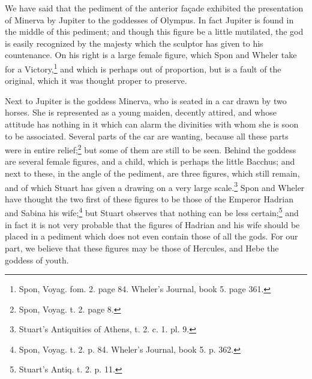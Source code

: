 \documentclass[a4paper, 11pt, oneside, polutonikogreek, english]{article}
\begin{document}
We have said that the pediment of the anterior façade exhibited the presentation of Minerva by Jupiter to the goddesses of Olympus. In fact Jupiter is found in the middle of this pediment; and though this figure be a little mutilated, the god is easily recognized by the majesty which the sculptor has given to his countenance. On his right is a large female figure, which Spon and Wheler take for a Victory,\footnote{Spon, Voyag. fom. 2. page 84. Wheler's Journal, book 5. page 361.} and which is perhaps out of proportion, but is a fault of the original, which it was thought proper to preserve.

Next to Jupiter is the goddess Minerva, who is seated in a car drawn by two horses. She is represented as a young maiden, decently attired, and whose attitude has nothing in it which can alarm the divinities with whom she is soon to be associated. Several parts of the car are wanting, because all these parts were in entire relief;\footnote{Spon, Voyag. t. 2. page 8.} but some of them are still to be seen. Behind the goddess are several female figures, and a child, which is perhaps the little Bacchus; and next to these, in the angle of the pediment, are three figures, which still remain, and of which Stuart has given a drawing on a very large scale.\footnote{Stuart's Antiquities of Athens, t. 2. c. 1. pl. 9.} Spon and Wheler have thought the two first of these figures to be those of the Emperor Hadrian and Sabina his wife;\footnote{Spon, Voyag. t. 2. p. 84. Wheler's Journal, book 5. p. 362.} but Stuart observes that nothing can be less certain;\footnote{Stuart's Antiq. t. 2. p. 11.} and in fact it is not very probable that the figures of Hadrian and his wife should be placed in a pediment which does not even contain those of all the gods. For our part, we believe that these figures may be those of Hercules, and Hebe the goddess of youth.
\end{document}
